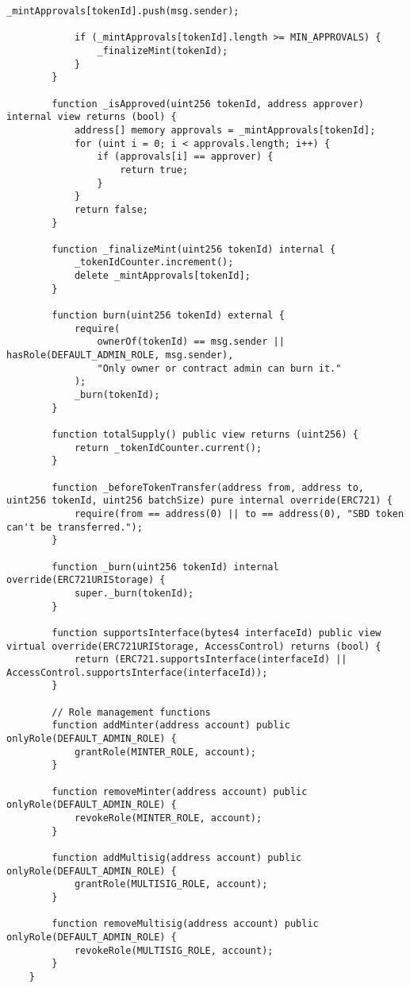 \begin{lstlisting}[label=lst:smartcon, language=Solidity, caption=Смарт-контракт]
            _mintApprovals[tokenId].push(msg.sender);
    
            if (_mintApprovals[tokenId].length >= MIN_APPROVALS) {
                _finalizeMint(tokenId);
            }
        }
    
        function _isApproved(uint256 tokenId, address approver) internal view returns (bool) {
            address[] memory approvals = _mintApprovals[tokenId];
            for (uint i = 0; i < approvals.length; i++) {
                if (approvals[i] == approver) {
                    return true;
                }
            }
            return false;
        }
    
        function _finalizeMint(uint256 tokenId) internal {
            _tokenIdCounter.increment();
            delete _mintApprovals[tokenId];
        }
    
        function burn(uint256 tokenId) external {
            require(
                ownerOf(tokenId) == msg.sender || hasRole(DEFAULT_ADMIN_ROLE, msg.sender), 
                "Only owner or contract admin can burn it."
            );
            _burn(tokenId);
        }
    
        function totalSupply() public view returns (uint256) {
            return _tokenIdCounter.current();
        }
    
        function _beforeTokenTransfer(address from, address to, uint256 tokenId, uint256 batchSize) pure internal override(ERC721) {
            require(from == address(0) || to == address(0), "SBD token can't be transferred.");
        }
    
        function _burn(uint256 tokenId) internal override(ERC721URIStorage) {
            super._burn(tokenId);
        }
    
        function supportsInterface(bytes4 interfaceId) public view virtual override(ERC721URIStorage, AccessControl) returns (bool) {
            return (ERC721.supportsInterface(interfaceId) || AccessControl.supportsInterface(interfaceId));
        }
    
        // Role management functions
        function addMinter(address account) public onlyRole(DEFAULT_ADMIN_ROLE) {
            grantRole(MINTER_ROLE, account);
        }
    
        function removeMinter(address account) public onlyRole(DEFAULT_ADMIN_ROLE) {
            revokeRole(MINTER_ROLE, account);
        }
    
        function addMultisig(address account) public onlyRole(DEFAULT_ADMIN_ROLE) {
            grantRole(MULTISIG_ROLE, account);
        }
    
        function removeMultisig(address account) public onlyRole(DEFAULT_ADMIN_ROLE) {
            revokeRole(MULTISIG_ROLE, account);
        }
    }
\end{lstlisting}

